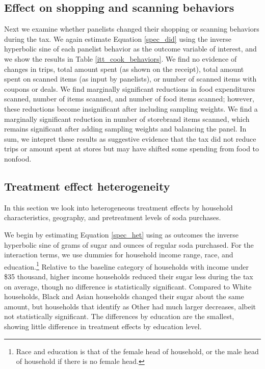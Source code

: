 \documentclass[12pt]{article}
\begin{document}
\subsection{Effect on shopping and scanning behaviors}

Next we examine whether panelists changed their shopping or scanning behaviors during the tax. We again estimate Equation \ref{spec_did} using the inverse hyperbolic sine of each panelist behavior as the outcome variable of interest, and we show the results in Table \ref{itt_cook_behaviors}. We find no evidence of changes in trips, total amount spent (as shown on the receipt), total amount spent on scanned items (as input by panelists), or number of scanned items with coupons or deals. We find marginally	significant reductions in food expenditures scanned, number of items scanned, and number of food items scanned; however, these reductions become insignificant after including sampling weights. We find a marginally significant reduction in number of storebrand items scanned, which remains significant after adding sampling weights and balancing the panel. In sum, we intepret these results as suggestive evidence that the tax did not reduce trips or amount spent at stores but may have shifted some spending from food to nonfood.

\subsection{Treatment effect heterogeneity}

In this section we look into heterogeneous treatment effects by household characteristics, geography, and pretreatment levels of soda purchases.

We begin by estimating Equation \ref{spec_het} using as outcomes the inverse hyperbolic sine of grams of sugar and ounces of regular soda purchased. For the interaction terms, we use dummies for household income range, race, and education.\footnote{Race and education is that of the female head of household, or the male head of household if there is no female head.} Relative to the baseline category of households with income under \$35 thousand, higher income households reduced their sugar less during the tax on average, though no difference is statistically significant. Compared to White households, Black and Asian households changed their sugar about the same amount, but households that identify as Other had much larger decreases, albeit not statistically significant. The differences by education are the smallest, showing little difference in treatment effects by education level.
\end{document}
